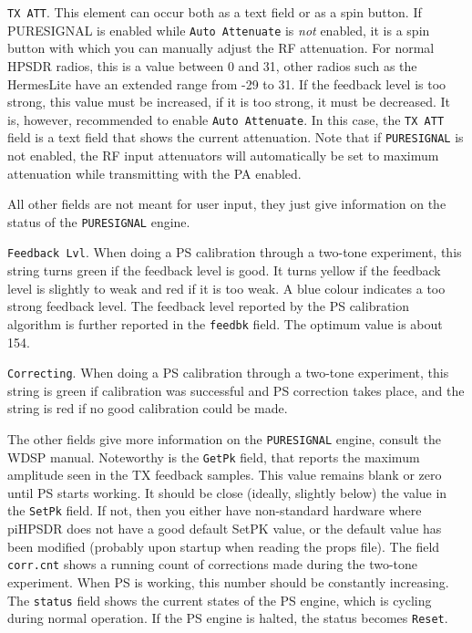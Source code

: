 \documentclass[12pt]{book}
\def\rett#1{\texttt{\color{red}#1}}
\def\bltt#1{\texttt{\color{blue}#1}}
\def\pH{pi\-HPSDR\xspace}
\begin{document}
\rett{TX ATT}. This element can occur both as a text field or as a spin button.
If PURESIGNAL is enabled while \rett{Auto Attenuate} is \textit{not} enabled, it is a spin button with which
you can manually adjust the RF attenuation. For normal HPSDR radios, this is a value
between 0 and 31, other radios such as the HermesLite have an extended range from
-29 to 31. If the feedback level is too strong, this value must be increased, if it
is too strong, it must be decreased. It is, however, recommended to enable \rett{Auto Attenuate}.
In this case, the \rett{TX ATT} field is a text field that shows the current attenuation.
Note that if \texttt{PURESIGNAL} is not enabled, the RF input attenuators
will automatically be set to maximum attenuation while transmitting with the PA enabled.

All other fields are not meant for user input, they just give information on the status
of the \texttt{PURESIGNAL} engine.

\rett{Feedback Lvl}. When doing a PS calibration through a two-tone experiment, this string
turns green if the feedback level is good. It turns yellow if the feedback level is slightly
to weak and red if it is too weak. A blue colour indicates a too strong feedback level.
The feedback level reported by the PS calibration algorithm is further reported in the
\rett{feedbk} field. The optimum value is about 154.

\rett{Correcting}. When doing a PS calibration through a two-tone experiment, this string
is green if calibration was successful and PS correction takes place, and the string is
red if no good calibration could be made.

The other fields give more information on the \texttt{PURESIGNAL} engine, consult the
WDSP manual. Noteworthy is the \rett{GetPk} field, that reports the maximum amplitude
seen in the TX feedback samples. This value remains blank or zero until PS starts working.
It should be close (ideally, slightly below) the value in the \texttt{SetPk} field.
If not, then you either have non-standard hardware where \pH does not have a good
default SetPK value, or the default value has been modified (probably upon startup
when reading the props file). The field \rett{corr.cnt} shows a running count of corrections
made during the two-tone experiment. When PS is working, this number should be constantly
increasing. The \rett{status} field shows the current states of
the PS engine, which is cycling during normal operation. If the PS engine is halted,
the status becomes \bltt{Reset}.
\end{document}
